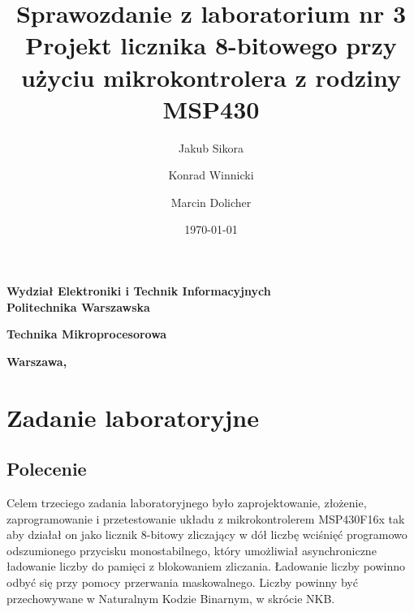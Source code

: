 \documentclass[a4paper,titlepage,11pt,floatssmall]{mwrep}
\title{\bf Sprawozdanie z laboratorium nr 3\\ Projekt licznika 8-bitowego przy użyciu mikrokontrolera z rodziny MSP430  \vskip 0.1cm}
\author{Jakub Sikora \and Konrad Winnicki \and Marcin Dolicher}
\date{\today}
\begin{document}
\makeatletter
\renewcommand{\maketitle}{\begin{titlepage}
		\begin{center}{\LARGE {\bf
					Wydział Elektroniki i Technik Informacyjnych}}\\
			\vspace{0.4cm}
			{\LARGE {\bf Politechnika Warszawska}}\\
			\vspace{0.3cm}
		\end{center}
		\vspace{5cm}
		\begin{center}
			{\bf \LARGE Technika Mikroprocesorowa \vskip 0.1cm}
		\end{center}
		\vspace{1cm}
		\begin{center}
			{\bf \LARGE \@title}
		\end{center}
		\vspace{2cm}
		\begin{center}
			{\bf \Large \@author \par}
		\end{center}
		\vspace*{\stretch{6}}
		\begin{center}
			\bf{\large{Warszawa, \@date\vskip 0.1cm}}
		\end{center}
	\end{titlepage}
	}
\makeatother
\maketitle

\tableofcontents


\chapter{Zadanie laboratoryjne}
\section{Polecenie}
\indent{} Celem trzeciego zadania laboratoryjnego było zaprojektowanie, złożenie, zaprogramowanie i przetestowanie układu z mikrokontrolerem MSP430F16x tak aby działał on jako licznik 8-bitowy zliczający w dół liczbę wciśnięć programowo odszumionego przycisku monostabilnego, który umożliwiał asynchroniczne ładowanie liczby do pamięci z blokowaniem zliczania. Ładowanie liczby powinno odbyć się przy pomocy przerwania maskowalnego. Liczby powinny być przechowywane w Naturalnym Kodzie Binarnym, w skrócie NKB.
\end{document}
